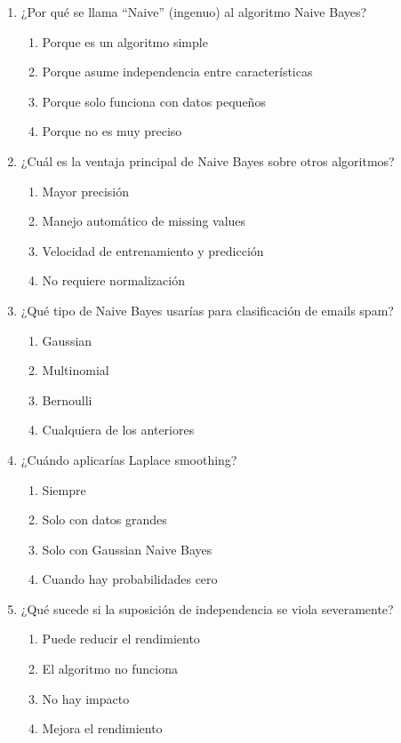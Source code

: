 \documentclass[12pt]{article}
\begin{document}
\begin{enumerate}
    \item ¿Por qué se llama ``Naive'' (ingenuo) al algoritmo Naive Bayes?
    \begin{enumerate}
        \item Porque es un algoritmo simple
        \item Porque asume independencia entre características
        \item Porque solo funciona con datos pequeños
        \item Porque no es muy preciso
    \end{enumerate}
    
    \item ¿Cuál es la ventaja principal de Naive Bayes sobre otros algoritmos?
    \begin{enumerate}
        \item Mayor precisión
        \item Manejo automático de missing values
        \item Velocidad de entrenamiento y predicción
        \item No requiere normalización
    \end{enumerate}
    
    \item ¿Qué tipo de Naive Bayes usarías para clasificación de emails spam?
    \begin{enumerate}
        \item Gaussian
        \item Multinomial
        \item Bernoulli
        \item Cualquiera de los anteriores
    \end{enumerate}
    
    \item ¿Cuándo aplicarías Laplace smoothing?
    \begin{enumerate}
        \item Siempre
        \item Solo con datos grandes
        \item Solo con Gaussian Naive Bayes
        \item Cuando hay probabilidades cero
    \end{enumerate}
    
    \item ¿Qué sucede si la suposición de independencia se viola severamente?
    \begin{enumerate}
        \item Puede reducir el rendimiento
        \item El algoritmo no funciona
        \item No hay impacto
        \item Mejora el rendimiento
    \end{enumerate}
\end{enumerate}
\end{document}

